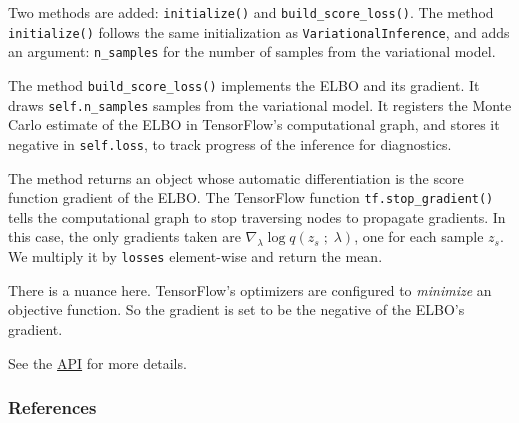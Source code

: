 Two methods are added: \texttt{initialize()} and
\texttt{build_score_loss()}.  The method \texttt{initialize()} follows
the same initialization as \texttt{VariationalInference}, and adds an
argument: \texttt{n_samples} for the number of samples from the
variational model.

The method \texttt{build_score_loss()} implements the ELBO and its
gradient. It draws \texttt{self.n_samples} samples from the
variational model. It registers the Monte Carlo
estimate of the ELBO in TensorFlow's computational graph, and stores it
negative in \texttt{self.loss}, to track progress of the inference for diagnostics.

The method returns an object whose automatic differentiation is the
score function gradient of the ELBO. The TensorFlow function
\texttt{tf.stop_gradient()} tells the computational graph to stop
traversing nodes to propagate gradients. In this case,
the only gradients taken are $\nabla_\lambda \log q(z_s\;;\;\lambda)$,
one for each sample $z_s$. We multiply it by \texttt{losses}
element-wise and return the mean.

There is a nuance here. TensorFlow's optimizers are configured to
\emph{minimize} an objective function. So the gradient is set to be
the negative of the ELBO's gradient.

See the \href{/api/}{API} for more details.

\subsubsection{References}\label{references}
